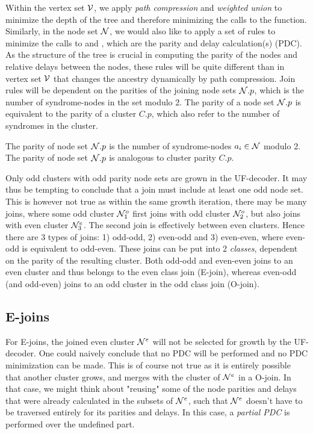 Within the vertex set $\mathcal{V}$, we apply \emph{path compression} and \emph{weighted union} to minimize the depth of the tree and therefore minimizing the calls to the  function. Similarly, in the node set $\mathcal{N}$, we would also like to apply a set of rules to minimize the calls to  and , which are the parity and delay calculation(s) (PDC). As the structure of the tree is crucial in computing the parity of the nodes and relative delays between the nodes, these rules will be quite different than in vertex set $\mathcal{V}$ that changes the ancestry dynamically by path compression. Join rules will be dependent on the parities of the joining node sets $\mathcal{N}.p$, which is the number of syndrome-nodes in the set modulo 2. The parity of a node set $\mathcal{N}.p$ is equivalent to the parity of a cluster $C.p$, which also refer to the number of syndromes in the cluster.
\begin{lemma}
  The parity of node set $\mathcal{N}.p$ is the number of syndrome-nodes $a_i \in \mathcal{N}$ modulo 2. The parity of node set $\mathcal{N}.p$ is analogous to cluster parity $C.p$.
\end{lemma}

Only odd clusters with odd parity node sets are grown in the UF-decoder. It may thus be tempting to conclude that a join must include at least one odd node set. This is however not true as within the same growth iteration, there may be many joins, where some odd cluster $\mathcal{N}_1^o$ first joins with odd cluster $\mathcal{N}_2^o$, but also joins with even cluster $\mathcal{N}_3^e$. The second join is effectively between even clusters. Hence there are 3 types of joins: 1) odd-odd, 2) even-odd and 3) even-even, where even-odd is equivalent to odd-even. These joins can be put into 2 \emph{classes}, dependent on the parity of the resulting cluster. Both odd-odd and even-even joins to an even cluster and thus belongs to the even class join (E-join), whereas even-odd (and odd-even) joins to an odd cluster in the odd class join (O-join).


\subsection{E-joins}

For E-joins, the joined even cluster $\mathcal{N}^e$ will not be selected for growth by the UF-decoder. One could naively conclude that no PDC will be performed and no PDC minimization can be made. This is of course not true as it is entirely possible that another cluster grows, and merges with the cluster of $\mathcal{N}^{e}$ in a O-join. In that case, we might think about "reusing" some of the node parities and delays that were already calculated in the subsets of $\mathcal{N}^e$, such that $\mathcal{N}^{e}$ doesn't have to be traversed entirely for its parities and delays. In this case, a \emph{partial PDC} is performed over the undefined part.

